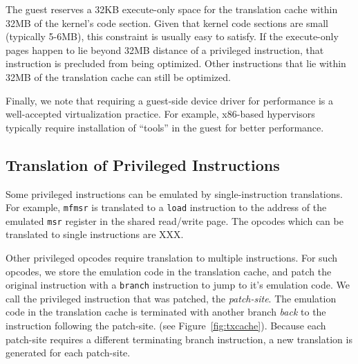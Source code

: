 \documentclass[10pt,twocolumn]{article}
\begin{document}
The guest reserves a 32KB execute-only space for the
translation cache within 32MB of the kernel's code
section. Given that kernel code sections are small (typically 5-6MB),
this constraint is usually easy to satisfy. If the execute-only
pages happen to lie beyond 32MB distance of a privileged instruction, that
instruction is precluded from being optimized. Other instructions that lie
within 32MB of the translation cache can still be optimized.

Finally, we note that requiring a guest-side device driver for performance
is a well-accepted virtualization practice. For example, x86-based hypervisors
typically require installation of ``tools'' in the guest for better performance.

\subsection{Translation of Privileged Instructions}
Some privileged instructions can
be emulated by single-instruction translations. For example, {\tt mfmsr} is translated
to a {\tt load} instruction to the address of the emulated {\tt msr}
register in the shared read/write page. The opcodes which can be
translated to single instructions are XXX.

Other privileged opcodes require translation to multiple instructions.
For such opcodes, we store the emulation code in the translation cache, and
patch the original instruction with a {\tt branch} instruction to jump to it's
emulation code. We call the privileged instruction
that was patched, the {\em patch-site}. The emulation code in the
translation cache is terminated
with another branch {\em back} to the instruction following the patch-site.
(see Figure~\ref{fig:txcache}). Because each patch-site requires a different
terminating branch instruction, a new translation is generated for
each patch-site.

\end{document}
